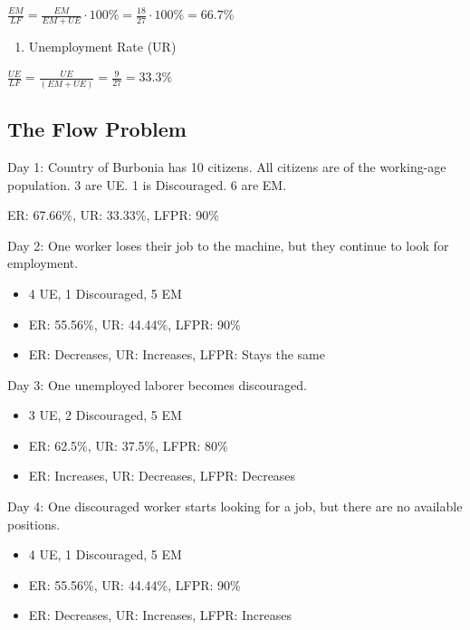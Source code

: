 \documentclass[
  letterpaper,
  DIV=11,
  numbers=noendperiod]{scrartcl}
\providecommand{\tightlist}{%
  \setlength{\itemsep}{0pt}\setlength{\parskip}{0pt}}\usepackage{longtable,booktabs,array}
\begin{document}
\(\frac{EM}{LF} = \frac{EM}{EM+UE} \cdot 100\% = \frac{18}{27} \cdot 100\% = 66.7\%\)

\begin{enumerate}
\def\labelenumi{\arabic{enumi}.}
\setcounter{enumi}{2}
\tightlist
\item
  Unemployment Rate (UR)
\end{enumerate}

\(\frac{UE}{LF} = \frac{UE}{(EM+UE)} = \frac{9}{27} = 33.3\%\)

\subsection{The Flow Problem}\label{the-flow-problem}

Day 1: Country of Burbonia has 10 citizens. All citizens are of the
working-age population. 3 are UE. 1 is Discouraged. 6 are EM.

ER: 67.66\%, UR: 33.33\%, LFPR: 90\%

Day 2: One worker loses their job to the machine, but they continue to
look for employment.

\begin{itemize}
\tightlist
\item
  4 UE, 1 Discouraged, 5 EM
\item
  ER: 55.56\%, UR: 44.44\%, LFPR: 90\%
\item
  ER: Decreases, UR: Increases, LFPR: Stays the same
\end{itemize}

Day 3: One unemployed laborer becomes discouraged.

\begin{itemize}
\tightlist
\item
  3 UE, 2 Discouraged, 5 EM
\item
  ER: 62.5\%, UR: 37.5\%, LFPR: 80\%
\item
  ER: Increases, UR: Decreases, LFPR: Decreases
\end{itemize}

Day 4: One discouraged worker starts looking for a job, but there are no
available positions.

\begin{itemize}
\tightlist
\item
  4 UE, 1 Discouraged, 5 EM
\item
  ER: 55.56\%, UR: 44.44\%, LFPR: 90\%
\item
  ER: Decreases, UR: Increases, LFPR: Increases
\end{itemize}
\end{document}
